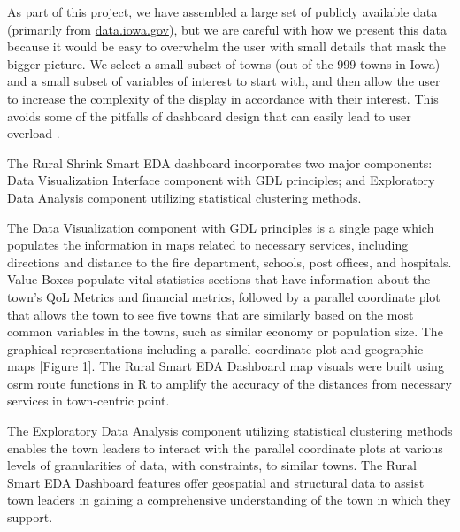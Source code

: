 \documentclass[10pt]{article}\usepackage[]{graphicx}\usepackage[]{color}
\begin{document}
As part of this project, we have assembled a large set of publicly available data (primarily from \url{data.iowa.gov}), but we are careful with how we present this data because it would be easy to overwhelm the user with small details that mask the bigger picture. We select a small subset of towns (out of the 999 towns in Iowa) and a small subset of variables of interest to start with, and then allow the user to increase the complexity of the display in accordance with their interest. This avoids some of the pitfalls of dashboard design that can easily lead to user overload \cite{few}.


The Rural Shrink Smart EDA dashboard incorporates two major components: Data Visualization Interface component with GDL principles; and Exploratory Data Analysis component utilizing statistical clustering methods.

The Data Visualization component with GDL principles is a single page which populates the information in maps related to necessary services, including directions and distance to the fire department, schools, post offices, and hospitals. Value Boxes populate vital statistics sections that have information about the town's QoL Metrics and financial metrics, followed by a parallel coordinate plot that allows the town to see five towns that are similarly based on the most common variables in the towns, such as similar economy or population size. The graphical representations including a parallel coordinate plot and geographic maps [Figure 1]. The Rural Smart EDA Dashboard map visuals were built using osrm route functions in R to amplify the accuracy of the distances from necessary services in town-centric point.

The Exploratory Data Analysis component utilizing statistical clustering methods enables the town leaders to interact with the parallel coordinate plots at various levels of granularities of data, with constraints, to similar towns. The Rural Smart EDA Dashboard features offer geospatial and structural data to assist town leaders in gaining a comprehensive understanding of the town in which they support. 
\end{document}
